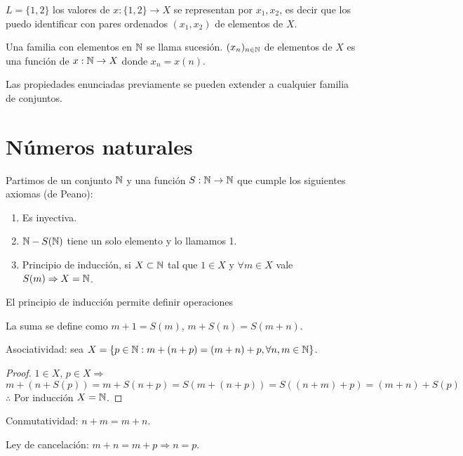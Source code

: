 \begin{eg}
    $L = \{ 1, 2 \}$ los valores de $x: \{1, 2\} \to X$ se representan por $x_1, x_2$, es decir que los puedo identificar con pares ordenados $(x_1, x_2)$ de elementos de $X$.
\end{eg}

Una familia con elementos en $\mathbb{N}$ se llama sucesión. $(x_n)_{n \in \mathbb{N}}$ de elementos de $X$ es una función de $x: \mathbb{N} \to X$ donde $x_n = x(n)$.

Las propiedades enunciadas previamente se pueden extender a cualquier familia de conjuntos.

\section{Números naturales}

Partimos de un conjunto $\mathbb{N}$ y una función $S: \mathbb{N} \to \mathbb{N}$ que cumple los siguientes axiomas (de Peano):
\begin{enumerate}
    \item Es inyectiva.
    \item $\mathbb{N} - S(\mathbb{N})$ tiene un solo elemento y lo llamamos 1.
    \item Principio de inducción, si $X \subset \mathbb{N}$ tal que $1 \in X$ y $\forall m \in X$ vale $S(m) \Rightarrow X = \mathbb{N}$.
\end{enumerate}

El principio de inducción permite definir operaciones

La suma se define como $m+1 = S(m)$, $m+S(n) = S(m+n)$.

\begin{prop}
    Asociatividad: sea $X = \{ p \in \mathbb{N} : m+(n+p) = (m+n) +p, \forall n,m \in \mathbb{N} \}$.
    \begin{proof}
        $1 \in X$, $p \in X \Rightarrow$ \begin{equation}
          m + (n+S(p)) = m + S(n+p) = S(m +(n+p)) = S((n+m)+p) = (m+n) + S(p)
        \end{equation}
        $\therefore$ Por inducción $X = \mathbb{N}$.
    \end{proof}
\end{prop}


\begin{prop}
    Conmutatividad: $n+m = m+n$.
\end{prop}

\begin{prop}
    Ley de cancelación: $m+n = m+p \Rightarrow n=p$.
\end{prop}

